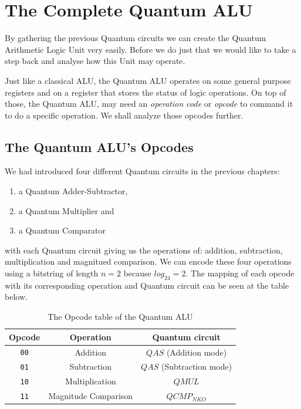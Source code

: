 \chapter{The Complete Quantum ALU}

By gathering the previous Quantum circuits we can create the Quantum Arithmetic Logic Unit very easily. Before
we do just that we would like to take a step back and analyse how this Unit may operate.

Just like a classical ALU, the Quantum ALU operates on some general purpose registers and on a register that stores
the status of logic operations. On top of those, the Quantum ALU, may need an \textit{operation code} or \textit{opcode}
to command it to do a specific operation. We shall analyze those opcodes further.

\section{The Quantum ALU's Opcodes}

We had introduced four different Quantum circuits in the previous chapters:
\begin{enumerate}
    \item a Quantum Adder-Subtractor,
    \item a Quantum Multiplier and
    \item a Quantum Comparator
\end{enumerate}
with each Quantum circuit giving us the operations of: addition, subtraction, multiplication and magnitued comparison.
We can encode these four operations using a bitstring of length $n=2$ because $log_24=2$. The mapping of each opcode with
its corresponding operation and Quantum circuit can be seen at the table below.

\begin{table}[ht]
    \centering
    \begin{tabular}{c|c|c}
        Opcode & Operation & Quantum circuit \\
        \hline
        \verb|00| & Addition & $QAS$ (Addition mode) \\
        \verb|01| & Subtraction & $QAS$ (Subtraction mode) \\
        \verb|10| & Multiplication & $QMUL$ \\
        \verb|11| & Magnitude Comparison & $QCMP_{NKO}$ \\
    \end{tabular}
    \caption{The Opcode table of the Quantum ALU}
\end{table}

